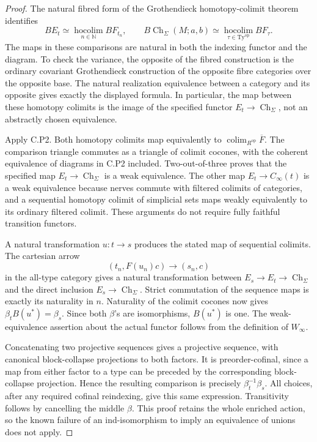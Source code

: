 \begin{proof}
The natural fibred form of the Grothendieck homotopy-colimit theorem \citep[Corollary~26.9]{ChacholskiSchererPATHS} identifies
\[
 BE_t\simeq\operatorname*{hocolim}_{n\in\mathbb N}BF_{t_n},
 \qquad
 B\operatorname{Ch}_\Sigma(M;a,b)
 \simeq\operatorname*{hocolim}_{\tau\in\mathrm{Ty}^{\mathrm{op}}}BF_\tau.
\]
The maps in these comparisons are natural in both the indexing functor and the diagram. To check the variance, the opposite of the fibred construction is the ordinary covariant Grothendieck construction of the opposite fibre categories over the opposite base. The natural realization equivalence between a category and its opposite gives exactly the displayed formula. In particular, the map between these homotopy colimits is the image of the specified functor $E_t\to\operatorname{Ch}_\Sigma$, not an abstractly chosen equivalence.

Apply C.P2. Both homotopy colimits map equivalently to
$\operatorname*{colim}_{R^{\mathrm{op}}}\overline F$.
The comparison triangle commutes as a triangle of colimit cocones, with the coherent equivalence of diagrams in C.P2 included. Two-out-of-three proves that the specified map $E_t\to\operatorname{Ch}_\Sigma$ is a weak equivalence. The other map $E_t\to C_\infty(t)$ is a weak equivalence because nerves commute with filtered colimits of categories, and a sequential homotopy colimit of simplicial sets maps weakly equivalently to its ordinary filtered colimit. These arguments do not require fully faithful transition functors.

A natural transformation $u:t\to s$ produces the stated map of sequential colimits. The cartesian arrow
\[
 (t_n,F(u_n)c)\longrightarrow(s_n,c)
\]
in the all-type category gives a natural transformation between
$E_s\to E_t\to\operatorname{Ch}_\Sigma$ and the direct inclusion
$E_s\to\operatorname{Ch}_\Sigma$. Strict commutation of the sequence maps
is exactly its naturality in $n$. Naturality of the colimit cocones now
gives $\beta_t B(u^*)=\beta_s$. Since both $\beta$'s are isomorphisms,
$B(u^*)$ is one. The weak-equivalence assertion about the actual functor
follows from the definition of $W_\infty$.

Concatenating two projective sequences gives a projective sequence, with canonical block-collapse projections to both factors. It is preorder-cofinal, since a map from either factor to a type can be preceded by the corresponding block-collapse projection. Hence the resulting comparison is precisely $\beta_t^{-1}\beta_s$. All choices, after any required cofinal reindexing, give this same expression. Transitivity follows by cancelling the middle $\beta$. This proof retains the whole enriched action, so the known failure of an ind-isomorphism to imply an equivalence of unions does not apply.
\end{proof}

